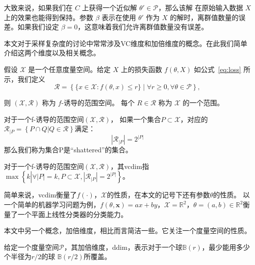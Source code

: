 大致来说，如果我们在 $C$ 上获得一个近似解 $\theta' \in \mathcal{P}$，那么该解
在原始输入数据 $X$ 上的效果也能得到保持。参数 $\beta$ 表示在使用 $\theta'$ 作为 $X$ 的解时，离群值数量的误
差。如果我们设定 $\beta = 0$，这意味着我们允许离群值数量没有误差。

本文对于采样复杂度的讨论中常常涉及VC维度和加倍维度的概念。在此我们简单介绍这两个维度以及相关概念。

\begin{definition}[f-诱导的范围空间]
  假设 $\mathcal{X}$ 是一个任意度量空间。给定 $X$ 上的损失函数 $f(\theta, X)$ 如公式~\eqref{eq:loss} 所示，我们定义
  \begin{equation}
  \mathcal{R} = \left\{ \{ x \in \mathcal{X} : f(\theta, x) \leq r \} \mid \forall r \geq 0, \forall \theta \in \mathcal{P} \right\},
  \end{equation}

则 $(\mathcal{X}, \mathcal{R})$ 称为 $f$-诱导的范围空间。
每个 $R \in \mathcal{R}$ 称为 $\mathcal{X}$ 的一个范围。
\end{definition}

\begin{definition}
  对于一个f-诱导的范围空间$(\mathcal{X},\mathcal{R})$，
  如果一个集合$P\subset \mathcal{X}$，对应的$\mathcal{R}_{|P}=\left\{P\cap Q|Q\in \mathcal{R}\right\}$满足：
  \begin{equation*}
    |\mathcal{R}_{|P}|=2^{|P|}
  \end{equation*}
  那么我们称为集合P是“shattered”的集合。
\end{definition}
\begin{definition}[VC dimension]
  对于一个f-诱导的范围空间$(\mathcal{X},\mathcal{R})$，其vcdim指$\max\left\{k\left.\right|\forall |P|=k,P\subset \mathcal{X},|\mathcal{R}_{|P}|=2^{|P|}\right\}$。
\end{definition}

简单来说，vcdim衡量了$f(\cdot)$，$\mathcal{X}$的性质，在本文的记号下还有参数$\theta$的性质。
以一个简单的机器学习问题为例，$f(\theta,\mathbf{x})=ax+by$，$\mathcal{X}=\mathbb{R}^2$，$\theta=(a,b)\in \mathbb{R}^2$衡量了一个平面上线性分类器的分类能力。

本文中另一个概念，加倍维度，相比而言简洁一些。它关注一个度量空间的性质。

\begin{definition}
  给定一个度量空间$\mathcal{P}$，其加倍维度，ddim，表示对于一个球$\mathbb{B}(r)$，最少能用多少个半径为$r/2$的球
  $\mathbb{B}(r/2)$所覆盖。
\end{definition}

